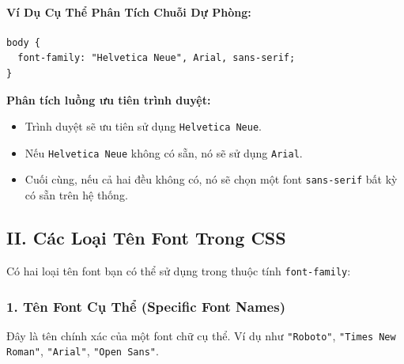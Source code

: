 \documentclass[11pt,oneside]{book}
\newcommand{\codeinline}[1]{\textcolor{accentOrange}{\texttt{#1}}}
\begin{document}
\paragraph{Ví Dụ Cụ Thể Phân Tích Chuỗi Dự Phòng:}
\begin{codeWindow}
\begin{lstlisting}[language=CSS3]
body {
  font-family: "Helvetica Neue", Arial, sans-serif;
}
\end{lstlisting}
\end{codeWindow}

\begin{browserWindow}
\begin{tcolorbox}[arc=4pt, colback=white, colframe=primaryBlue!30, boxrule=0.8pt, top=10pt, bottom=10pt, left=12pt, right=12pt]
  {\sffamily\bfseries\color{primaryBlue} Phân tích luồng ưu tiên trình duyệt:}\par\vspace{4pt}
  \begin{itemize}[leftmargin=1.2em, itemsep=3pt, parsep=0pt]
    \item Trình duyệt sẽ ưu tiên sử dụng \codeinline{Helvetica Neue}.
    \item Nếu \codeinline{Helvetica Neue} không có sẵn, nó sẽ sử dụng \codeinline{Arial}.
    \item Cuối cùng, nếu cả hai đều không có, nó sẽ chọn một font \codeinline{sans-serif} bất kỳ có sẵn trên hệ thống.
  \end{itemize}
\end{tcolorbox}
\end{browserWindow}

\subsection*{II. Các Loại Tên Font Trong CSS}

Có hai loại tên font bạn có thể sử dụng trong thuộc tính \codeinline{font-family}:

\subsubsection*{1. Tên Font Cụ Thể (Specific Font Names)}
Đây là tên chính xác của một font chữ cụ thể. Ví dụ như \codeinline{"Roboto"}, \codeinline{"Times New Roman"}, \codeinline{"Arial"}, \codeinline{"Open Sans"}.
\end{document}
